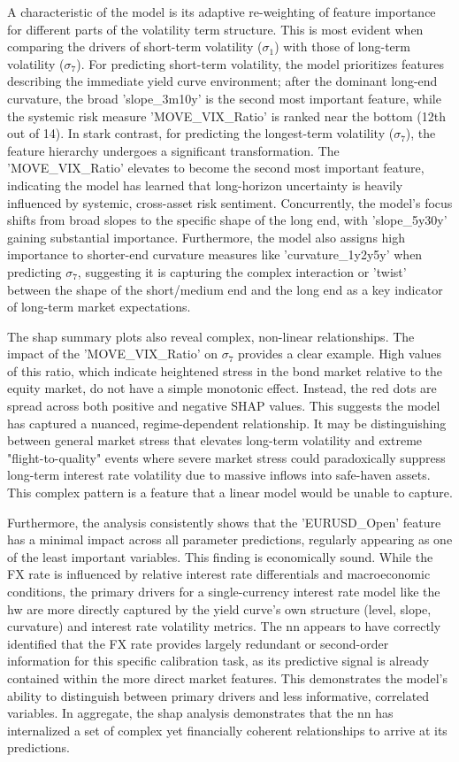 A characteristic of the model is its adaptive re-weighting of feature importance for different parts of the volatility term structure. This is most evident when comparing the drivers of short-term volatility ($\sigma_1$) with those of long-term volatility ($\sigma_7$). For predicting short-term volatility, the model prioritizes features describing the immediate yield curve environment; after the dominant long-end curvature, the broad 'slope\_3m10y' is the second most important feature, while the systemic risk measure 'MOVE\_VIX\_Ratio' is ranked near the bottom (12th out of 14). In stark contrast, for predicting the longest-term volatility ($\sigma_7$), the feature hierarchy undergoes a significant transformation. The 'MOVE\_VIX\_Ratio' elevates to become the second most important feature, indicating the model has learned that long-horizon uncertainty is heavily influenced by systemic, cross-asset risk sentiment. Concurrently, the model's focus shifts from broad slopes to the specific shape of the long end, with 'slope\_5y30y' gaining substantial importance. Furthermore, the model also assigns high importance to shorter-end curvature measures like 'curvature\_1y2y5y' when predicting $\sigma_7$, suggesting it is capturing the complex interaction or 'twist' between the shape of the short/medium end and the long end as a key indicator of long-term market expectations.

The \ac{shap} summary plots also reveal complex, non-linear relationships. The impact of the 'MOVE\_VIX\_Ratio' on $\sigma_7$ provides a clear example. High values of this ratio, which indicate heightened stress in the bond market relative to the equity market, do not have a simple monotonic effect. Instead, the red dots are spread across both positive and negative SHAP values. This suggests the model has captured a nuanced, regime-dependent relationship. It may be distinguishing between general market stress that elevates long-term volatility and extreme "flight-to-quality" events where severe market stress could paradoxically suppress long-term interest rate volatility due to massive inflows into safe-haven assets. This complex pattern is a feature that a linear model would be unable to capture.

Furthermore, the analysis consistently shows that the 'EURUSD\_Open' feature has a minimal impact across all parameter predictions, regularly appearing as one of the least important variables. This finding is economically sound. While the FX rate is influenced by relative interest rate differentials and macroeconomic conditions, the primary drivers for a single-currency interest rate model like the \ac{hw} are more directly captured by the yield curve's own structure (level, slope, curvature) and interest rate volatility metrics. The \ac{nn} appears to have correctly identified that the FX rate provides largely redundant or second-order information for this specific calibration task, as its predictive signal is already contained within the more direct market features. This demonstrates the model's ability to distinguish between primary drivers and less informative, correlated variables. In aggregate, the \ac{shap} analysis demonstrates that the \ac{nn} has internalized a set of complex yet financially coherent relationships to arrive at its predictions.

